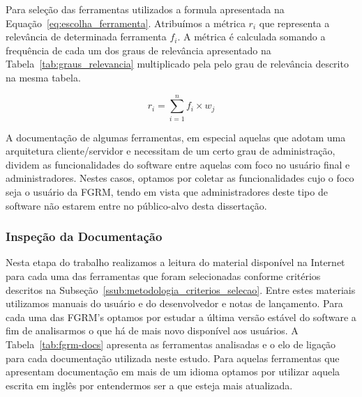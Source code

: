 Para seleção das ferramentas utilizados a formula apresentada na
Equação~\ref{eq:escolha_ferramenta}.  Atribuímos a métrica $r_i$ que representa
a relevância de determinada ferramenta $f_i$. A métrica é calculada somando a
frequência de cada um dos graus de relevância apresentado na
Tabela~\ref{tab:graus_relevancia} multiplicado pela pelo grau de relevância
descrito na mesma tabela.

\begin{equation}
\label{eq:escolha_ferramenta}
r_i = \sum_{i=1}^{n} f_i \times w_j
\end{equation}

A documentação de algumas ferramentas, em especial aquelas que adotam uma
arquitetura cliente/servidor e necessitam de um certo grau de administração,
dividem as funcionalidades do software entre aquelas com foco no usuário final e
ad\-mi\-nis\-tra\-do\-res. Nestes casos, optamos por coletar as funcionalidades
cujo o foco seja o usuário da FGRM, tendo em vista que administradores deste
tipo de software não estarem entre no público-alvo desta dissertação.

\begin{table}[htb]
\centering
\caption{Graus de Relevância}
\label{tab:graus_relevancia}
\end{table}

\subsubsection{Inspeção da Documentação}
\label{subsec:inspecao_doumentacao}

Nesta etapa do trabalho realizamos a leitura do material disponível na Internet
para cada uma das ferramentas que foram selecionadas conforme critérios
descritos na Subseção~\ref{ssub:metodologia_criterios_selecao}. Entre estes
materiais utilizamos manuais do usuário e do desenvolvedor e notas de
lançamento. Para cada uma das FGRM's optamos por estudar a última versão estável
do software a fim de analisarmos o que há de mais novo disponível aos usuários.
A Tabela~\ref{tab:fgrm-docs} apresenta as ferramentas analisadas e o elo de
ligação para cada documentação utilizada neste estudo. Para aquelas ferramentas
que apresentam documentação em mais de um i\-di\-o\-ma optamos por utilizar
aquela escrita em inglês por entendermos ser a que esteja mais atualizada.

